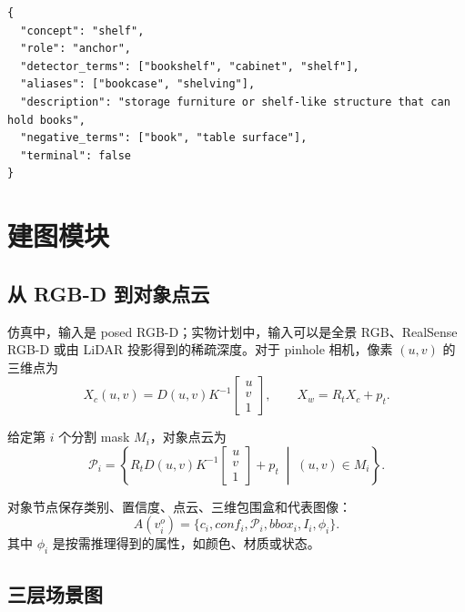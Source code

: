 \documentclass[UTF8,zihao=-4]{ctexart}
\begin{document}
\begin{lstlisting}[style=json,caption={Concept grounding 输出示例}]
{
  "concept": "shelf",
  "role": "anchor",
  "detector_terms": ["bookshelf", "cabinet", "shelf"],
  "aliases": ["bookcase", "shelving"],
  "description": "storage furniture or shelf-like structure that can hold books",
  "negative_terms": ["book", "table surface"],
  "terminal": false
}
\end{lstlisting}

\section{建图模块}

\subsection{从 RGB-D 到对象点云}

仿真中，输入是 posed RGB-D；实物计划中，输入可以是全景 RGB、RealSense RGB-D
或由 LiDAR 投影得到的稀疏深度。对于 pinhole 相机，像素 $(u,v)$ 的三维点为
\begin{equation}
  X_c(u,v)
  =
  D(u,v)K^{-1}
  \begin{bmatrix}
  u\\v\\1
  \end{bmatrix},
  \qquad
  X_w = R_tX_c + p_t .
  \label{eq:back_projection}
\end{equation}

给定第 $i$ 个分割 mask $M_i$，对象点云为
\begin{equation}
  \mathcal{P}_i =
  \left\{
  R_tD(u,v)K^{-1}
  \begin{bmatrix}u\\v\\1\end{bmatrix}
  +p_t
  \;\middle|\;
  (u,v)\in M_i
  \right\}.
  \label{eq:object_cloud}
\end{equation}

对象节点保存类别、置信度、点云、三维包围盒和代表图像：
\begin{equation}
  A(v_i^o)=
  \{c_i, conf_i,\mathcal{P}_i,bbox_i,I_i,\phi_i\}.
\end{equation}
其中 $\phi_i$ 是按需推理得到的属性，如颜色、材质或状态。

\subsection{三层场景图}
\end{document}
